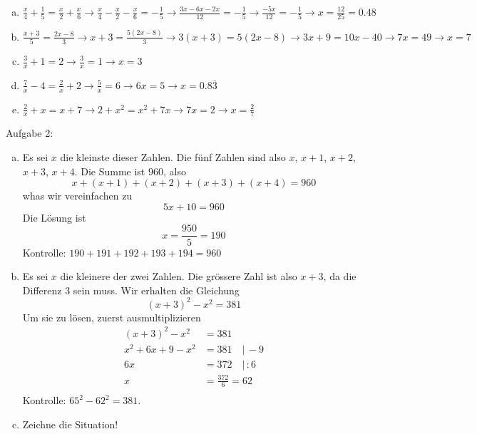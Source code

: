 \documentclass[%
11pt,%
twoside,%
titlepage,%
german,%
headsepline%
]{scrartcl}
\begin{document}
{\begin{enumerate}[a)]
                                \item $\frac{x}{4}+\frac{1}{5}=\frac{x}{2}+\frac{x}{6}\rightarrow \frac{x}{4}-\frac{x}{2}-\frac{x}{6} = -\frac{1}{5} \rightarrow  \frac{3x-6x-2x}{12}=-\frac{1}{5} \rightarrow \frac{-5x}{12}=-\frac{1}{5}\rightarrow x=\frac{12}{25}={0.48}$
                                \item $\frac{x+3}{5}=\frac{2x-8}{3}\rightarrow x+3 = \frac{5(2x-8)}{3}\rightarrow 3(x+3)=5(2x-8) \rightarrow 3x+9=10x-40 \rightarrow 7x=49 \rightarrow x={7}$
                                \item $\frac{3}{x}+1 = 2\rightarrow \frac{3}{x}=1\rightarrow x={3}$
                                \item $\frac{7}{x}-4 = \frac{2}{x}+2\rightarrow \frac{5}{x}=6 \rightarrow 6x=5 \rightarrow x={0.8\overline{3}}$
                                \item $\frac{2}{x}+x = x+7\rightarrow 2+x^2 = x^2+7x \rightarrow 7x=2 \rightarrow x={\frac{2}{7}}$  
                \end{enumerate}
                Aufgabe 2:
                \begin{enumerate}[a)]
                                \item Es sei $x$ die kleinste dieser Zahlen. Die fünf Zahlen sind also $x$, $x+1$, $x+2$, $x+3$, $x+4$. Die Summe ist $960$, also $$x+(x+1)+(x+2)+(x+3)+(x+4)=960$$ whas wir vereinfachen zu $${5x+10=960}$$ Die Lösung ist $$x=\frac{950}{5}={190}$$ Kontrolle: $190+191+192+193+194=960$
                                \item Es sei $x$ die kleinere der zwei Zahlen. Die grössere Zahl ist also $x+3$, da die Differenz $3$ sein muss. Wir erhalten die Gleichung $${(x+3)^2-x^2=381}$$ Um sie zu lösen, zuerst ausmultiplizieren
                                \begin{align*}
                                (x+3)^2-x^2 & =381 \\
                                {x^2}+6x+9 -{x^2} & = 381 \quad | \, -9\\
                                6x & = 372 \quad | \, :6\\
                                x & =\frac{372}{6}={62}\\ 
                                \end{align*}
                                Kontrolle: $65^2-62^2=381$.
                                \item Zeichne die Situation! 

\end{enumerate}}
\end{document}
